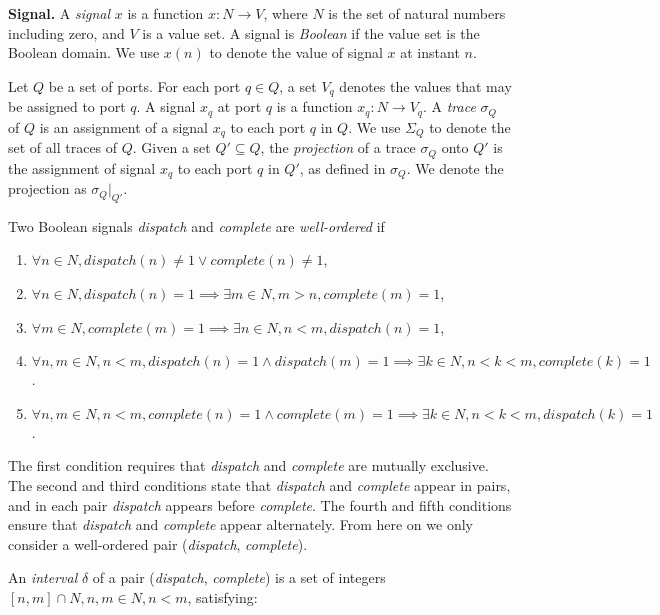 {\bf Signal.}
A \emph{signal} $x$ is a function $x: N \rightarrow V$, where $N$ is the set of natural numbers including zero, and $V$ is a value set. 
A signal is \emph{Boolean} if the value set is the Boolean domain.
We use $x(n)$ to denote the value of signal $x$ at instant $n$. 

\bigskip
{}
Let $Q$ be a set of ports. 
For each port $q \in Q$, a set $V_q$ denotes the values that may be assigned to port $q$. 
A signal $x_q$ at port $q$ is a function $x_q: N \rightarrow V_q$.
A \emph{trace} $\sigma_Q$ of $Q$ is an assignment of a signal $x_q$ to each port $q$ in $Q$.
We use $\Sigma_Q$ to denote the set of all traces of $Q$.
Given a set $Q' \subseteq Q$, the \emph{projection} of a trace $\sigma_Q$ onto $Q'$ is the assignment of signal $x_q$ to each port $q$ in $Q'$, as defined in $\sigma_Q$. We denote the projection as $\sigma_Q|_{Q'}$.

\bigskip 
{}
Two Boolean signals \emph{dispatch} and \emph{complete} are \emph{well-ordered} if 

\begin{enumerate}
	\item $\forall n \in N, dispatch(n) \ne 1 \vee complete(n) \ne 1 $,
	\item $ \forall n\in N, dispatch(n) = 1 \implies \exists m\in N, m > n, complete(m) =  1 $,
	\item $ \forall m\in N, complete(m) = 1 \implies \exists n\in N, n < m, dispatch(n) =  1 $,
	\item $ \forall n,m\in N, n < m, dispatch(n) = 1 \wedge dispatch(m) = 1 \implies \exists k\in N, n < k < m, complete(k) = 1 $.
	\item $ \forall n,m\in N, n < m, complete(n) = 1 \wedge complete(m) = 1 \implies \exists k\in N, n < k < m, dispatch(k) = 1 $.
\end{enumerate}

The first condition requires that \emph{dispatch} and \emph{complete} are mutually exclusive. The second and third conditions state that \emph{dispatch} and \emph{complete} appear in pairs, and in each pair \emph{dispatch} appears before \emph{complete}. The fourth and fifth conditions ensure that \emph{dispatch} and \emph{complete} appear alternately. 
From here on we only consider a well-ordered pair (\emph{dispatch}, \emph{complete}).

An \emph{interval} $\delta$ of a pair (\emph{dispatch}, \emph{complete}) is a set of integers $[n, m] \cap N, n,m \in N, n < m$, satisfying:

